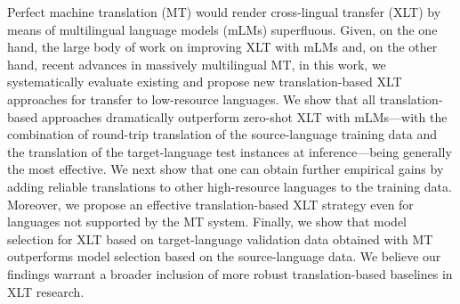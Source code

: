 Perfect machine translation (MT) would render cross-lingual transfer (XLT) by means of multilingual language models (mLMs) superfluous. Given, on the one hand, the large body of work on improving XLT with mLMs and, on the other hand, recent advances in massively multilingual MT, in this work, we systematically evaluate existing and propose new translation-based XLT approaches for transfer to low-resource languages. We show that all translation-based approaches dramatically outperform zero-shot XLT with mLMs---with the combination of round-trip translation of the source-language training data and the translation of the target-language test instances at inference---being generally the most effective. We next show that one can obtain further empirical gains by adding reliable translations to other high-resource languages to the training data. Moreover, we propose an effective translation-based XLT strategy even for languages not supported by the MT system. Finally, we show that model selection for XLT based on target-language validation data obtained with MT outperforms model selection based on the source-language data. We believe our findings warrant a broader inclusion of more robust translation-based baselines in XLT research.